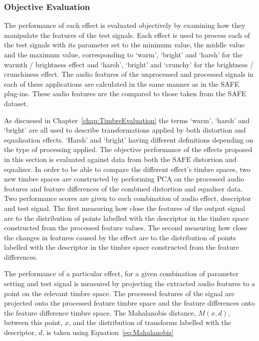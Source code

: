 		\subsubsection*{Objective Evaluation}
			The performance of each effect is evaluated objectively by examining how they manipulate the
			features of the test signals. Each effect is used to process each of the test signals with its
			parameter set to the minimum value, the middle value and the maximum value, corresponding to
			`warm', `bright' and `harsh' for the warmth / brightness effect and `harsh', `bright' and `crunchy'
			for the brightness / crunchiness effect. The audio features of the unprocessed and processed
			signals in each of these applications are calculated in the same manner as in the SAFE plug-ins.
			These audio features are the compared to those taken from the SAFE dataset.

			As discussed in Chapter~\ref{chap:TimbreEvaluation} the terms `warm', `harsh' and `bright' are all
			used to describe transformations applied by both distortion and equalisation effects. `Harsh' and
			`bright' having different definitions depending on the type of processing applied. The objective
			performance of the effects proposed in this section is evaluated against data from both the SAFE
			distortion and equaliser. In order to be able to compare the different effect's timbre spaces, two
			new timbre spaces are constructed by performing PCA on the processed audio features and feature
			differences of the combined distortion and equaliser data. Two performance scores are given to each
			combination of audio effect, descriptor and test signal. The first measuring how close the features
			of the output signal are to the distribution of points labelled with the descriptor in the timbre
			space constructed from the processed feature values. The second measuring how close the changes in
			features caused by the effect are to the distribution of points labelled with the descriptor in the
			timbre space constructed from the feature differences.

			The performance of a particular effect, for a given combination of parameter setting and test
			signal is measured by projecting the extracted audio features to a point on the relevant timbre
			space. The processed features of the signal are projected onto the processed feature timbre space
			and the feature differences onto the feature difference timbre space. The Mahalanobis distance,
			$M(x, d)$, between this point, $x$, and the distribution of transforms labelled with the
			descriptor, $d$, is taken using Equation~\ref{eq:Mahalanobis}
			
